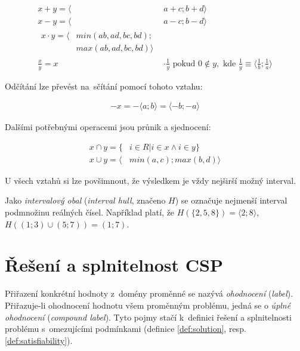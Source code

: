 \begin{subequations}
\begin{align}
   x+y = \langle & a + c;  b + d \rangle\\
   x-y = \langle & a - c;  b - d \rangle\\
   \begin{split}x  \cdot y = \langle & min(ab, ad, bc, bd); \\ & max(ab, ad, bc, bd) \rangle \end{split}\\
   \frac{x}{y} = x & \cdot \frac{1}{y} \mbox{ pokud } 0 \notin y, \mbox{ kde } \frac{1}{y} \equiv \langle  \frac{1}{b}; \frac{1}{a} \rangle
\end{align}
\end{subequations}

Odčítání lze převést na~sčítání pomocí tohoto vztahu:

\begin{subequations}
\begin{align}
   -x = - \langle a;b \rangle = \langle -b; -a \rangle
\end{align}
\end{subequations}


Dalšími potřebnými operacemi jsou průnik a sjednocení:

\begin{subequations}
\begin{align}
   x \cap y = \{ & i \in R | i \in x \wedge i \in y \} \\
   x \cup y = \langle & min(a, c); max(b, d) \rangle
\end{align}
\end{subequations}


U všech vztahů si lze povšimnout, že výsledkem je vždy nejširší možný interval.

Jako \emph{intervalový obal} (\emph{interval hull}, značeno $H$) se označuje nejmenší interval  podmnožinu reálných čísel. Například platí, že $H(\{2,5,8\}) = \langle 2; 8 \rangle$, $H((1;3) \cup (5;7)) = (1;7)$.











\section{Řešení a splnitelnost CSP}
Přiřazení konkrétní hodnoty z~domény proměnné se nazývá \emph{ohodnocení} (\emph{label}). Přiřazuje-li ohodnocení hodnotu všem proměnným problému, jedná se o \emph{úplné ohodnocení} (\emph{compound label}). Tyto pojmy stačí k~definici řešení a splnitelnosti problému s~omezujícími podmínkami (definice \ref{def:solution}, resp. \ref{def:satisfiability}).

